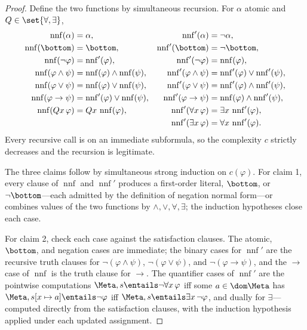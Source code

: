 \begin{proof}
Define the two functions by simultaneous recursion.  For \(\alpha\)
atomic and \(Q\in\set{\forall,\exists}\),
\[
\begin{aligned}
 \operatorname{nnf}(\alpha)&=\alpha,
 &\operatorname{nnf}'(\alpha)&=\neg\alpha,\\
 \operatorname{nnf}(\bottom)&=\bottom,
 &\operatorname{nnf}'(\bottom)&=\neg\bottom,\\
 \operatorname{nnf}(\neg\varphi)&=\operatorname{nnf}'(\varphi),
 &\operatorname{nnf}'(\neg\varphi)&=\operatorname{nnf}(\varphi),\\
 \operatorname{nnf}(\varphi\land\psi)&=
   \operatorname{nnf}(\varphi)\land\operatorname{nnf}(\psi),
 &\operatorname{nnf}'(\varphi\land\psi)&=
   \operatorname{nnf}'(\varphi)\lor\operatorname{nnf}'(\psi),\\
 \operatorname{nnf}(\varphi\lor\psi)&=
   \operatorname{nnf}(\varphi)\lor\operatorname{nnf}(\psi),
 &\operatorname{nnf}'(\varphi\lor\psi)&=
   \operatorname{nnf}'(\varphi)\land\operatorname{nnf}'(\psi),\\
 \operatorname{nnf}(\varphi\to\psi)&=
   \operatorname{nnf}'(\varphi)\lor\operatorname{nnf}(\psi),
 &\operatorname{nnf}'(\varphi\to\psi)&=
   \operatorname{nnf}(\varphi)\land\operatorname{nnf}'(\psi),\\
 \operatorname{nnf}(Qx\,\varphi)&=Qx\,\operatorname{nnf}(\varphi),
 &\operatorname{nnf}'(\forall x\,\varphi)&=
   \exists x\,\operatorname{nnf}'(\varphi),\\
 &&\operatorname{nnf}'(\exists x\,\varphi)&=
   \forall x\,\operatorname{nnf}'(\varphi).
\end{aligned}
\]
Every recursive call is on an immediate subformula, so the complexity
\(c\) strictly decreases and the recursion is legitimate.

The three claims follow by simultaneous strong induction on
\(c(\varphi)\).  For claim 1, every clause of \(\operatorname{nnf}\) and
\(\operatorname{nnf}'\) produces a first-order literal, \(\bottom\), or
\(\neg\bottom\)---each admitted by the definition of negation normal
form---or combines values of the two functions by
\(\land,\lor,\forall,\exists\); the induction hypotheses close each case.

For claim 2, check each case against the satisfaction clauses.  The
atomic, \(\bottom\), and negation cases are immediate; the binary cases
for \(\operatorname{nnf}'\) are the recursive truth clauses for
\(\neg(\varphi\land\psi)\), \(\neg(\varphi\lor\psi)\), and
\(\neg(\varphi\to\psi)\), and the \(\to\) case of \(\operatorname{nnf}\)
is the truth clause for \(\to\).  The quantifier cases of
\(\operatorname{nnf}'\) are the pointwise computations
\(\Meta,s\entails\neg\forall x\,\varphi\) iff some \(a\in\dom\Meta\) has
\(\Meta,s[x\mapsto a]\entails\neg\varphi\) iff
\(\Meta,s\entails\exists x\,\neg\varphi\), and dually for
\(\exists\)---computed directly from the satisfaction clauses, with the
induction hypothesis applied under each updated assignment.


\end{proof}
